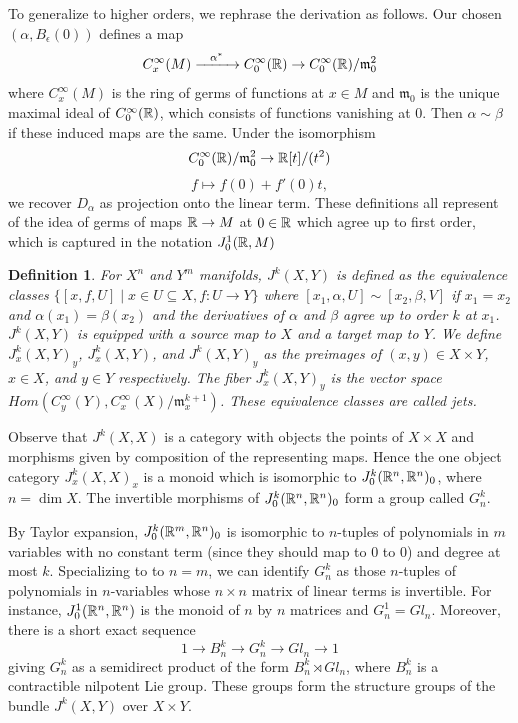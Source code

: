 \documentclass{article}
\newtheorem{definition}[theorem]{Definition}
\newtheorem{proposed work}[theorem]{Proposed Work}
\theoremstyle{definition}
\begin{document}
To generalize to higher orders, we rephrase the derivation as follows. Our chosen $(\alpha, B_{\epsilon}(0))$ defines a map
\[
  {C^\infty_{  x  }(M)} \xrightarrow{\,\,\,\,\,\,\alpha^*\,\,\,\,\,\,} C^\infty_0(\mathbb R) \to C^\infty_0(\mathbb R)/  {\mathfrak{m}_0^2}
\]
where $C^\infty_x(M)$ is the ring of germs of functions at $x \in M$ and $\mathfrak{m}_0$ is the unique maximal ideal of $C^\infty_0(\mathbb R)$, which consists of functions vanishing at 0. Then $\alpha\sim\beta$ if these induced maps are the same. Under the isomorphism
\[C_0^\infty(\mathbb R)/\mathfrak{m}_0^2\to \mathbb R[t]/(t^2)\]
\[f\mapsto f(0)+f'(0)t,\]
we recover $D_\alpha$ as projection onto the linear term. These definitions all represent of the idea of germs of maps $\mathbb R \to M$ at $0\in\mathbb R$ which agree up to first order, which is captured in the notation $J^1_0(\mathbb R, M)$


\begin{definition}
For $X^n$ and $Y^m$ manifolds, $J^k(X,Y)$ is defined as the equivalence classes $\{[x,f, U] \mid x\in U\subseteq X, f:U\to Y\}$ 
where $[x_1, \alpha, U]\sim [x_2, \beta, V]$ if $x_1=x_2$ and $\alpha(x_1)=\beta(x_2)$ and the derivatives of $\alpha$ and $\beta$ agree up to order $k$ at $x_1$.
$J^k(X,Y)$ is equipped with a source map to $X$ and a target map to $Y$.
We define $J^k_x(X,Y)_y$, $J^k_x(X,Y)$, and $J^k(X,Y)_y$ as the preimages of $(x,y)\in X\times Y$, $x\in X$, and $y\in Y$ respectively.
The fiber $J^k_x(X,Y)_y$ is the vector space $Hom(C^\infty_y(Y), C^\infty_x(X)/\mathfrak{m}_x^{k+1})$.
These equivalence classes are called jets.
\end{definition}

Observe that $J^k(X,X)$ is a category with objects the points of $X\times X$ and morphisms given by composition of the representing maps.  Hence the one object category $J^k_x(X,X)_x$ is a monoid which is isomorphic to $J^k_0(\mathbb R^n,\mathbb R^n)_0$, where $n=\dim X$. The invertible morphisms of $J^k_0(\mathbb R^n, \mathbb R^n)_0$ form a group called $G^k_n$.

By Taylor expansion, $J^k_0(\mathbb R^m, \mathbb R^n)_0$ is isomorphic to $n$-tuples of polynomials in $m$ variables with no constant term (since they should map to 0 to 0) and degree at most $k$. Specializing to to $n=m$, we can identify $G^k_n$ as those $n$-tuples of polynomials in $n$-variables whose $n\times n$ matrix of linear terms is invertible. For instance, $J^1_0(\mathbb R^n,\mathbb R^n)$ is the monoid of $n$ by $n$ matrices and $G^1_n=Gl_n$. Moreover, there is a short exact sequence
\[
  1\to B_n^k\to G^k_n\to Gl_n\to 1
\]
giving $G^k_n$ as a semidirect product of the form $B_n^k \rtimes Gl_n$,  where $B_n^k$ is a contractible nilpotent Lie group. These groups form the structure groups of the bundle $J^k(X,Y)$ over $X\times Y$.
\end{document}
